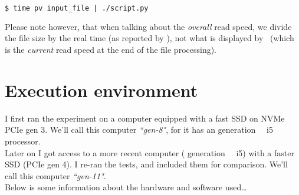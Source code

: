 \begin{lstlisting}[language=sh]
$ time pv input_file | ./script.py
\end{lstlisting}





Please note however, that when talking about the \emph{overall} read speed, we divide the file size by the real time (as reported by ), not what is displayed by \pv\ (which is the \emph{current} read speed at the end of the file processing). 


\section*{Execution environment} \label{execution-environment}


I first ran the experiment on a computer equipped with a fast SSD on NVMe PCIe gen 3. 
We'll call this computer \emph{``gen-8"}, for it has an  generation \Intel\ \Core~i5 processor. \\

Later on I got access to a more recent computer ( generation \Intel\ \Core~i5) with a faster SSD (PCIe gen 4). I re-ran the tests, and included them for comparison.
We'll call this computer \emph{``gen-11"}. \\



Below is some information about the hardware and software used\ldots

